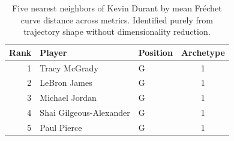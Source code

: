 \begin{table}[htbp]
  \centering\small
  \begin{tabular}{rllc}
    \toprule
    Rank & Player & Position & Archetype \\
    \midrule
    1 & Tracy McGrady & G & 1 \\
    2 & LeBron James & G & 1 \\
    3 & Michael Jordan & G & 1 \\
    4 & Shai Gilgeous-Alexander & G & 1 \\
    5 & Paul Pierce & G & 1 \\
    \bottomrule
  \end{tabular}
  \caption{Five nearest neighbors of Kevin Durant by mean Fr\'{e}chet curve distance across metrics. Identified purely from trajectory shape without dimensionality reduction.}
  \label{tab:Kevin_Durant_frechet_curve_neighbors}
\end{table}

